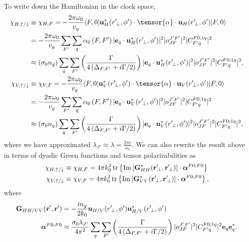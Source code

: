 \documentclass[preprint,aps,pra,onecolumn]{revtex4-1} %
\begin{document}
To write down the Hamiltonian in the clock space,
\begin{align}
\chi_{H,\uparrow/\downarrow} & \equiv \chi_{H,F} =- \frac{2\pi \omega_0}{v_g} \bra{F,0} 
	\mathbf{u}^*_H(r^\prime\!_\perp, \phi') \cdot \tensor{\alpha} \cdot 
	\mathbf{u}_{H}(r^\prime\!_\perp, 
	\phi') \ket{F,0} \\
	& =- \frac{2\pi \omega_0}{v_g} \sum_{F'} \sum_q \alpha_0\left( F,F'  \right) |\mathbf{e}_q \cdot 
	\mathbf{u}_H^*(r^\prime\!_\perp,\phi')|^2 |o^{J'F'}_{JF} |^2 
	|C^{F 0;1q}_{F' q}|^2\\
	& \approx  \left( \sigma_0 n_g  \right)  \sum_q \sum_{F'} \left( 
		\frac{\Gamma}{4 
		\left(\Delta_{F,F'}+i\Gamma/2\right) }  \right) |\mathbf{e}_q \cdot 
		\mathbf{u}_H^*(r^\prime\!_\perp,\phi')|^2 |o^{J'F'}_{JF} |^2 
		|C^{F 0;1q}_{F' q}|^2,\label{eq:chiHeu}\\
\chi_{V,\uparrow/\downarrow} & \equiv \chi_{V,F} =- \frac{2\pi \omega_0}{v_g} \bra{F,0} 
	\mathbf{u}^*_V(r^\prime\!_\perp, \phi') \cdot \tensor{\alpha} \cdot 
	\mathbf{u}_{V}(r^\prime\!_\perp, 
	\phi') \ket{F,0} \\
	& =- \frac{2\pi \omega_0}{v_g} \sum_{F'} \sum_q \alpha_0\left( F,F'  \right) |\mathbf{e}_q \cdot 
	\mathbf{u}_V^*(r^\prime\!_\perp,\phi')|^2 |o^{J'F'}_{JF} |^2 
	|C^{F 0;1q}_{F' q}|^2\\
	& \approx   \left( \sigma_0 n_g  \right)  \sum_q\sum_{F'} \left( 
		\frac{\Gamma}{4 
		\left(\Delta_{F,F'}+i\Gamma/2\right) }  \right) |\mathbf{e}_q \cdot 
		\mathbf{u}_V^*(r^\prime\!_\perp,\phi')|^2 |o^{J'F'}_{JF} |^2 
		|C^{F 0;1q}_{F' q}|^2,\label{eq:chiVeu}\\
\end{align}
where we have approximated $ \lambda_{J'}\approx \lambda = \frac{2\pi c}{\omega_0} $.  We can also 
rewrite the result above in terms of dyadic Green functions and tensor polarizabilities as
\begin{align}
\chi_{H,\uparrow/\downarrow} & \equiv \chi_{H,F} = 4\pi k_0^2 \operatorname{tr} \left\{ \mathrm{Im}\left[ 
\mathbf{G}^*_{HH}(\mathbf{r}^\prime\!_\perp,\mathbf{r}^\prime\!_\perp) \right] \cdot \boldsymbol{\alpha}^{F0;F0} 
\right\}\label{eq:chiHGalpha}\\
\chi_{V,\uparrow/\downarrow} & \equiv \chi_{V,F} = 4\pi k_0^2 \operatorname{tr} \left\{ \mathrm{Im}\left[ 
\mathbf{G}^*_{VV}(\mathbf{r}^\prime\!_\perp,\mathbf{r}^\prime\!_\perp) \right] \cdot \boldsymbol{\alpha}^{F0;F0} 
\right\},\label{eq:chiGalpha}
\end{align}
where 
\begin{align} 
\mathbf{G}_{HH/VV}(\mathbf{r}',\mathbf{r}') &= -\frac{in_g}{2k_0} 
\mathbf{u}_{H/V}(r^\prime\!_\perp,\phi')\mathbf{u}_{H/V}^*(r^\prime\!_\perp,\phi')\\
\boldsymbol{\alpha}^{F0;F0} &\approx \frac{\sigma_0\lambda_{J'}}{4\pi^2}  \sum_q \sum_{F'} \left( 
		\frac{\Gamma}{4 
		\left(\Delta_{F,F'}+i\Gamma/2\right) }  \right)   |o^{J'F'}_{JF} |^2 
		|C^{F 0;1q}_{F' q}|^2  \mathbf{e}_q \mathbf{e}_q^*.
\end{align}
\end{document}
